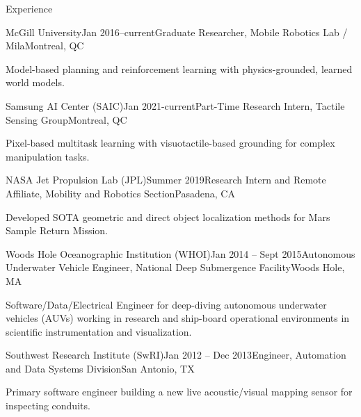 \documentclass{resume} %
\begin{document}
\begin{rSection}{Experience}
\begin{rSubsection}{McGill University}{Jan 2016--current}{Graduate Researcher, Mobile Robotics Lab / Mila}{Montreal, QC}
\item{Model-based planning and reinforcement learning with physics-grounded, learned world models. }
\end{rSubsection}
\vspace{-.2cm}
	\begin{rSubsection}{Samsung AI Center (SAIC)}{Jan 2021-current}{Part-Time Research Intern, Tactile Sensing Group}{Montreal, QC}
\item{Pixel-based multitask learning with visuotactile-based grounding for complex manipulation tasks. }
\end{rSubsection}
\vspace{-.2cm}
\begin{rSubsection}{NASA Jet Propulsion Lab (JPL)}{Summer 2019}{Research Intern and Remote Affiliate, Mobility and Robotics Section}{Pasadena, CA}
\item{Developed SOTA geometric and direct object localization methods for Mars Sample Return Mission. }
\end{rSubsection}
	\vspace{-.2cm}
\begin{rSubsection}{Woods Hole Oceanographic Institution (WHOI)}{Jan 2014 -- Sept 2015}{Autonomous Underwater Vehicle Engineer, National Deep Submergence Facility}{Woods Hole, MA}
\item{Software/Data/Electrical Engineer for deep-diving autonomous underwater vehicles (AUVs) working in research and ship-board operational environments in scientific instrumentation and visualization.} 
\end{rSubsection}
	\vspace{-.2cm}
\begin{rSubsection}{Southwest Research Institute (SwRI)}{Jan 2012 -- Dec 2013}{Engineer, Automation and Data Systems Division}{San Antonio, TX}{}
\item{Primary software engineer building a new live acoustic/visual mapping sensor for inspecting conduits. }
\end{rSubsection}
\end{rSection}
	\vspace{-.5cm}
\end{document}
